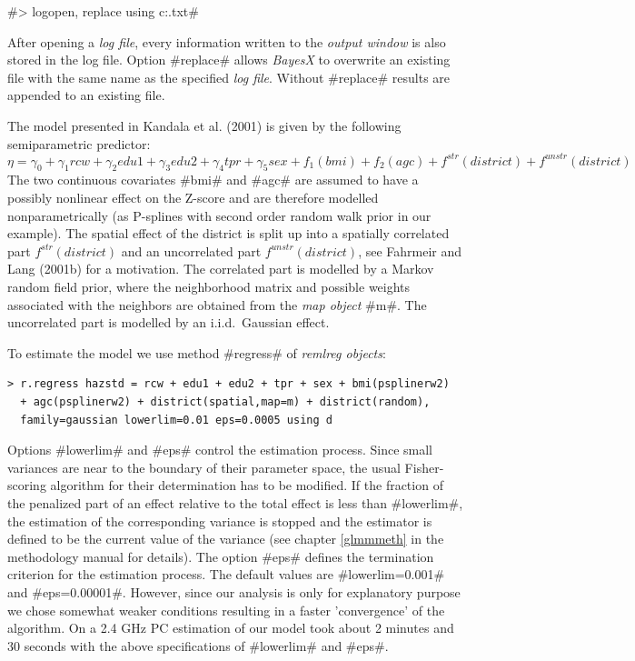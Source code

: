 \documentclass[11pt,a4paper,twoside]{bayesxreport}
\begin{document}
#> logopen, replace using c:\data\logreml.txt#

After opening a {\it log file}, every information written to the
{\em output window} is also stored in the log file. Option #replace#
allows {\it BayesX} to overwrite an existing file with the same name
as the specified {\it log file}. Without #replace# results are
appended to an existing file.

The model presented in Kandala et al. (2001) is given by the
following semiparametric predictor:
\[\eta=\gamma_0+\gamma_1rcw+\gamma_2edu1+\gamma_3edu2+\gamma_4tpr+\gamma_5sex+f_1(bmi)+f_2(agc)+f^{str}(district)+f^{unstr}(district)\]
The two continuous covariates #bmi# and #agc# are assumed to have a
possibly nonlinear effect on the Z-score and are therefore modelled
nonparametrically (as P-splines with second order random walk prior
in our example). The spatial effect of the district is split up into
a spatially correlated part $ f^{str}(district)$ and an uncorrelated
part $f^{unstr}(district)$, see Fahrmeir and Lang (2001b) for a
motivation. The correlated part is modelled by a Markov random field
prior, where the neighborhood matrix and possible weights associated
with the neighbors are obtained from the {\it map object} #m#. The
uncorrelated part is modelled by an i.i.d.~Gaussian effect.

To estimate the model we use method #regress# of {\em remlreg
objects}:
\begin{verbatim}
> r.regress hazstd = rcw + edu1 + edu2 + tpr + sex + bmi(psplinerw2)
  + agc(psplinerw2) + district(spatial,map=m) + district(random),
  family=gaussian lowerlim=0.01 eps=0.0005 using d
\end{verbatim}

Options #lowerlim# and #eps# control the estimation process. Since
small variances are near to the boundary of their parameter space,
the usual Fisher-scoring algorithm for their determination has to be
modified. If the fraction of the penalized part of an effect
relative to the total effect is less than #lowerlim#, the estimation
of the corresponding variance is stopped and the estimator is
defined to be the current value of the variance (see chapter
\ref*{glmmmeth} in the methodology manual for details). The option
#eps# defines the termination criterion for the estimation process.
The default values are #lowerlim=0.001# and #eps=0.00001#. However,
since our analysis is only for explanatory purpose we chose somewhat
weaker conditions resulting in a faster 'convergence' of the
algorithm. On a 2.4 GHz PC estimation of our model took about 2
minutes and 30 seconds with the above specifications of #lowerlim#
and #eps#.
\end{document}
